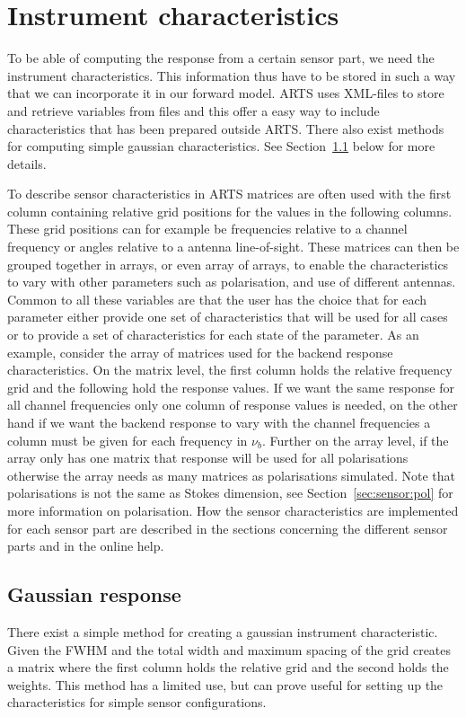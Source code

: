 \section{Instrument characteristics}
\label{sec:sensor:instchar}
To be able of computing the response from a certain sensor part, we 
need the instrument characteristics. This information thus have to 
be stored in such a way that we can incorporate it in our forward 
model. ARTS uses XML-files to store and retrieve variables from 
files and this offer a easy way to include characteristics that has been prepared outside ARTS. 
There also exist methods for computing simple gaussian
characteristics. See Section~\ref{sec:sensor:instchar:gauss} below for more details.

To describe sensor characteristics in ARTS matrices are often used with the first column containing relative grid positions for the values in the following columns. These grid positions can for example be frequencies relative to a channel frequency or angles relative to a antenna line-of-sight. These matrices can then be grouped together in arrays, or even array of arrays, to enable the characteristics to vary with other parameters such as polarisation, and use of different antennas. Common to all these variables are that the user has the choice that for each parameter either provide one set of characteristics that will be used for all cases or to provide a set of characteristics for each state of the parameter. As an example, consider the array of matrices used for the backend response characteristics. On the matrix level, the first column holds the relative frequency grid and the following hold the response values. If we want the same response for all channel frequencies only one column of response values is needed, on the other hand if we want the backend response to vary with the channel frequencies a column must be given for each frequency in $\nu_b$. Further on the array level, if the array only has one matrix that response will be used for all polarisations otherwise the array needs as many matrices as polarisations simulated. Note that polarisations is not the same as Stokes dimension, see Section~\ref{sec:sensor:pol} for more information on polarisation.
How the sensor characteristics are implemented for each sensor part are described in the 
sections concerning the different sensor parts and in the online help.

\subsection{Gaussian response}
\label{sec:sensor:instchar:gauss}
There exist a simple method for creating a gaussian instrument characteristic. Given the FWHM and the total width and maximum spacing of the grid  creates a matrix where the first column holds the relative grid and the second holds the weights. This method has a limited use, but can prove useful for setting up the characteristics for simple sensor configurations.

